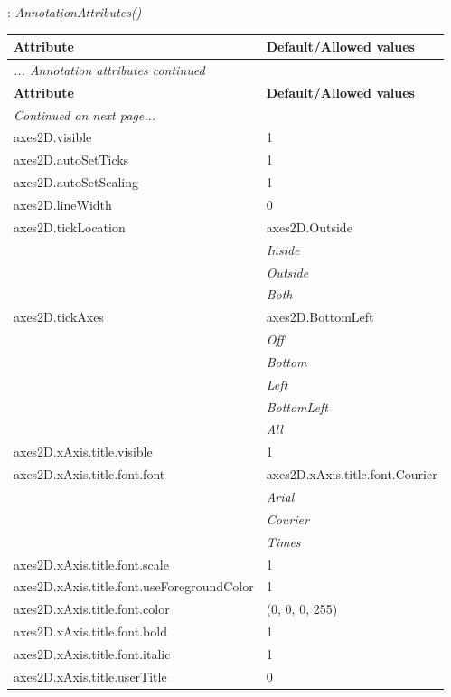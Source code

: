 \documentclass[10pt,a4paper]{report}
\begin{document}
\newpage

{}
: {\it AnnotationAttributes() }\\[-3mm]

\begin{longtable}{ll}
{\bf Attribute} & {\bf Default/Allowed values} \\
\hline \hline
\endfirsthead
\multicolumn{2}{l}{{\it ... Annotation attributes continued}} \\
{\bf Attribute} & {\bf Default/Allowed values} \\
\hline \hline
\endhead
\hline
\multicolumn{2}{l}{{\it Continued on next page...}} \\
\endfoot
\hline
\endlastfoot

axes2D.visible  &  1 \\
axes2D.autoSetTicks  &  1 \\
axes2D.autoSetScaling  &  1 \\
axes2D.lineWidth  &  0 \\
axes2D.tickLocation  &  axes2D.Outside   \\
 & {\it  Inside} \\
 & {\it  Outside} \\
 & {\it  Both} \\
axes2D.tickAxes  &  axes2D.BottomLeft   \\
 & {\it  Off} \\
 & {\it  Bottom} \\
 & {\it  Left} \\
 & {\it  BottomLeft} \\
 & {\it  All} \\
axes2D.xAxis.title.visible  &  1 \\
axes2D.xAxis.title.font.font  &  axes2D.xAxis.title.font.Courier   \\
 & {\it  Arial} \\
 & {\it  Courier} \\
 & {\it  Times} \\
axes2D.xAxis.title.font.scale  &  1 \\
axes2D.xAxis.title.font.useForegroundColor  &  1 \\
axes2D.xAxis.title.font.color  &  (0, 0, 0, 255) \\
axes2D.xAxis.title.font.bold  &  1 \\
axes2D.xAxis.title.font.italic  &  1 \\
axes2D.xAxis.title.userTitle  &  0 \\

\end{longtable}
\end{document}
